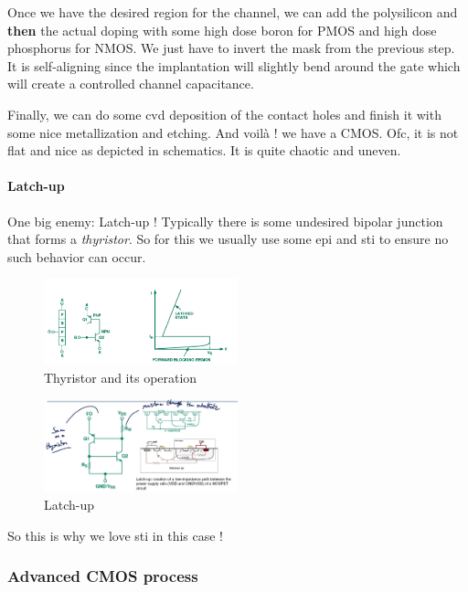 \documentclass[
]{article}
\begin{document}
Once we have the desired region for the channel, we can add the
polysilicon and \textbf{then} the actual doping with some high dose
boron for PMOS and high dose phosphorus for NMOS. We just have to invert
the mask from the previous step. It is self-aligning since the
implantation will slightly bend around the gate which will create a
controlled channel capacitance.

Finally, we can do some {cvd} deposition of the contact holes and finish
it with some nice metallization and etching. And voilà ! we have a CMOS.
Ofc, it is not flat and nice as depicted in schematics. It is quite
chaotic and uneven.

\hypertarget{latch-up}{%
\paragraph{Latch-up}\label{latch-up}}

One big enemy: Latch-up ! Typically there is some undesired bipolar
junction that forms a \emph{thyristor}. So for this we usually use some
{epi} and {sti} to ensure no such behavior can occur.

\begin{figure}
\hypertarget{fig:enter-label}{%
\centering
\includegraphics[width=0.5\textwidth,height=\textheight]{thyristor_operation.png}
\caption{Thyristor and its operation}\label{fig:enter-label}
}
\end{figure}

\begin{figure}
\hypertarget{fig:enter-label}{%
\centering
\includegraphics[width=0.5\textwidth,height=\textheight]{latchup.png}
\caption{Latch-up}\label{fig:enter-label}
}
\end{figure}

So this is why we love {sti} in this case !

\hypertarget{advanced-cmos-process}{%
\subsubsection{Advanced CMOS process}\label{advanced-cmos-process}}
\end{document}
